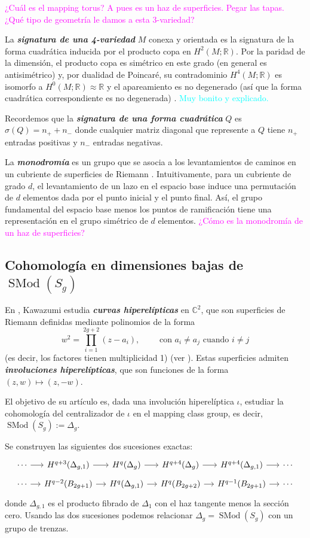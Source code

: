 \documentclass[spanish]{article}
\theoremstyle{definition}
\newcommand{\R}{\mathbb{R}}
\newcommand{\C}{\mathbb{C}}
\DeclareMathOperator{\SMod}{SMod}
\begin{document}
\textcolor{magenta}{¿Cuál es el mapping torus? A pues es un haz de superficies. Pegar las tapas. ¿Qué tipo de geometría le damos a esta 3-variedad?}

La \textbf{\textit{signatura de una 4-variedad}} $M$ conexa y orientada es la signatura de la forma cuadrática inducida por el producto copa en $H^2(M;\R)$. Por la paridad de la dimensión, el producto copa es simétrico en este grado (en general es antisimétrico) y, por dualidad de Poincaré, su contradominio $H^4(M;\R)$ es isomorfo a $H^0(M;\R)\approx\R$ y el apareamiento es no degenerado (así que la forma cuadrática correspondiente es no degenerada) \cite{wiki}. \textcolor{cyan}{Muy bonito y explicado.}

Recordemos que la \textbf{\textit{signatura de una forma cuadrática}} $Q$ es $\sigma(Q)=n_++n_-$ donde cualquier matriz diagonal que represente a $Q$ tiene $n_+$ entradas positivas y $n_-$ entradas negativas.

La \textbf{\textit{monodromía}} es un grupo que se asocia a los levantamientos de caminos en un cubriente de superficies de Riemann \cite{diez}. Intuitivamente, para un cubriente de grado $d$, el levantamiento de un lazo en el espacio base induce una permutación de $d$ elementos dada por el punto inicial y el punto final. Así, el grupo fundamental del espacio base menos los puntos de ramificación tiene una representación en el grupo simétrico de $d$ elementos. \textcolor{magenta}{¿Cómo es la monodromía de un haz de superficies?}\fi

\subsection{Cohomología en dimensiones bajas de $\SMod(S_g)$}
En \cite{kawazumi}, Kawazumi estudia \textbf{\textit{curvas hiperelípticas}} en $\C^2$, que son superficies de Riemann definidas mediante polinomios de la forma
\[w^2=\prod_{i=1}^{2g+2}(z-a_i),\qquad \text{ con }a_i\neq a_j \text{ cuando }i\neq j\]
(es decir, los factores tienen multiplicidad 1) (ver \cite{diez}). Estas superficies admiten \textbf{\textit{involuciones hiperelípticas}}, que son funciones de la forma $(z,w)\mapsto (z,-w)$.

El objetivo de su artículo es, dada una involución hiperelíptica $\iota$, estudiar la cohomología del centralizador de $\iota$ en el mapping class group, es decir, $\SMod(S_g):=\Delta_g$.

Se construyen las siguientes dos sucesiones exactas:
\[\begin{tikzcd}[column sep=small,row sep=tiny]
	\cdots\arrow[r]&H^{q+3}(\Delta_{g,1})\arrow[r]&H^q(\Delta_g)\arrow[r]&H^{q+4}(\Delta_g)\arrow[r]&H^{q+4}(\Delta_{g,1})\arrow[r]&\cdots
	\\
	\cdots\arrow[r]&H^{q-2}(B_{2g+1})\arrow[r]&H^q(\Delta_{g,1})\arrow[r]&H^q(B_{2g+2})\arrow[r]&H^{q-1}(B_{2g+1})\arrow[r]&\cdots
\end{tikzcd}\]
donde $\Delta_{g,1}$ es el producto fibrado de $\Delta_1$ con el haz tangente menos la sección cero. Usando las dos sucesiones podemos relacionar $\Delta_g=\SMod(S_g)$ con un grupo de trenzas.
\end{document}
